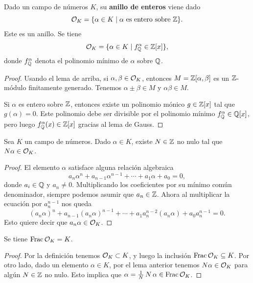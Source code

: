 \begin{proposicion-definicion}
  Dado un campo de números $K$, su \textbf{anillo de enteros} viene dado
  $$\mathcal{O}_K = \{ \alpha \in K \mid \alpha\text{ es entero sobre }\mathbb{Z} \}.$$
  Este es un anillo. Se tiene
  $$\mathcal{O}_K = \{ \alpha \in K \mid f_{\mathbb{Q}}^\alpha \in \mathbb{Z} [x] \},$$
  donde $f_{\mathbb{Q}}^\alpha$ denota el polinomio mínimo de $\alpha$ sobre $\mathbb{Q}$.

  \begin{proof}
    Usando el lema de arriba, si $\alpha,\beta \in \mathcal{O}_K$, entonces
    $M = \mathbb{Z} [\alpha,\beta]$ es un $\mathbb{Z}$-módulo finitamente generado. Tenemos
    $\alpha\pm\beta \in M$ y $\alpha\beta \in M$.

    Si $\alpha$ es entero sobre $\mathbb{Z}$, entonces existe un polinomio mónico
    $g \in \mathbb{Z} [x]$ tal que $g (\alpha) = 0$. Este polinomio debe ser
    divisible por el polinomio mínimo $f_{\mathbb{Q}}^\alpha \in \mathbb{Q} [x]$, pero luego
    $f_{\mathbb{Q}}^\alpha (x) \in \mathbb{Z} [x]$ gracias al lema de Gauss.
  \end{proof}
\end{proposicion-definicion}


\begin{lema}
  Sea $K$ un campo de números. Dado $\alpha \in K$, existe $N \in \mathbb{Z}$ no nulo
  tal que $N\alpha \in \mathcal{O}_K$.

  \begin{proof}
    El elemento $\alpha$ satisface alguna relación algebraica
    $$a_n \alpha^n + a_{n-1} \alpha^{n-1} + \cdots + a_1 \alpha + a_0 = 0,$$   
    donde $a_i \in \mathbb{Q}$ y $a_n \ne 0$. Multiplicando los coeficientes por su
    mínimo común denominador, siempre podemos asumir que $a_n \in \mathbb{Z}$. Ahora
    al multiplicar la ecuación por $a_n^{n-1}$ nos queda
    \[ (a_n \alpha)^n + a_{n-1} (a_n \alpha)^{n-1} + \cdots +
           a_1 a_n^{n-2} (a_n \alpha) + a_0 a_n^{n-1} = 0. \]
    Esto quiere decir que $a_n \alpha \in \mathcal{O}_K$.
  \end{proof}
\end{lema}

\begin{proposicion}
  Se tiene $\operatorname{Frac}\mathcal{O}_K = K$.

  \begin{proof}
    Por la definición tenemos $\mathcal{O}_K \subset K$, y luego la inclusión
    $\operatorname{Frac} \mathcal{O}_K \subseteq K$. Por otro lado, dado un elemento $\alpha \in K$,
    por el lema anterior tenemos $N\alpha \in \mathcal{O}_K$ para algún $N \in \mathbb{Z}$
    no nulo. Esto implica que $\alpha = \frac{1}{N}\,N\,\alpha \in \operatorname{Frac}\mathcal{O}_K$.
  \end{proof}
\end{proposicion}

